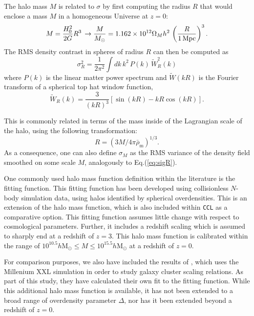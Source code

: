 \documentclass[\docopts]{\docclass}
\newcommand{\ccl}{{\tt CCL}\xspace}
\begin{document}
The halo mass $M$ is related to $\sigma$ by first computing the radius $R$ that would enclose a mass $M$ in a homogeneous Universe at $z=0$:
\begin{equation}
  M=\frac{H_0^2}{2G}R^3\,\rightarrow \frac{M}{M_\odot}=1.162\times10^{12}\Omega_Mh^2\,\left(\frac{R}{1\,{\rm Mpc}}\right)^3.
\end{equation}
The RMS density contrast in spheres of radius $R$ can then be computed as
\begin{equation}
  \sigma_R^2 = \frac{1}{2\pi^2}\int dk\,k^2\,P(k)\,\tilde{W}_R^2(k)
  \label{eq:sigR}
\end{equation}
where $P(k)$ is the linear matter power spectrum and $\tilde{W}(kR)$ is the Fourier transform of a spherical top hat window function,
\begin{equation}
\tilde{W}_R(k) = \frac{3}{(kR)^3}[\sin(kR)-kR\cos(kR)].
\end{equation}

This is commonly related in terms of the mass inside of the Lagrangian scale of the halo, using the following transformation:
\begin{equation}
R = (3M/4\pi{\bar\rho_{\mathrm{m}}})^{1/3}.
\end{equation}
As a consequence, one can also define $\sigma_M$ as the RMS variance of the density field smoothed on some scale $M$, analogously to Eq.(\ref{eq:sigR}).

One commonly used halo mass function definition within the literature is the \citet{Tinker2010} fitting function. This fitting function has been developed using collisionless $N$-body simulation data, using halos identified by spherical overdensities. This is an extension of the \citet{Tinker2008} halo mass function, which is also included within \ccl as a comparative option. This fitting function assumes little change with respect to cosmological parameters. Further, it includes a redshift scaling which is assumed to sharply end at a redshift of $z = 3$. This halo mass function is calibrated within the range of $10^{10.5} h\mathrm{M}_\odot \leq M \leq 10^{15.5} h\mathrm{M}_\odot$ at a redshift of $z = 0$.

For comparison purposes, we also have included the results of \citet{Angulo2012}, which uses the Millenium XXL simulation in order to study galaxy cluster scaling relations. As part of this study, they have calculated their own fit to the \citet{Tinker2010} fitting function. While this additional halo mass function is available, it has not been extended to a broad range of overdensity parameter $\Delta$, nor has it been extended beyond a redshift of $z = 0$.
\end{document}
